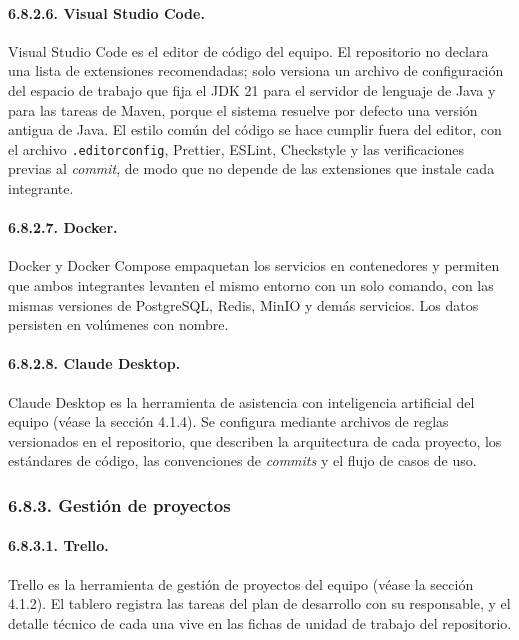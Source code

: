\paragraph{6.8.2.6. Visual Studio Code.}

Visual Studio Code es el editor de código del equipo. El repositorio no declara una lista de extensiones recomendadas; solo versiona un archivo de configuración del espacio de trabajo que fija el JDK 21 para el servidor de lenguaje de Java y para las tareas de Maven, porque el sistema resuelve por defecto una versión antigua de Java. El estilo común del código se hace cumplir fuera del editor, con el archivo \texttt{.editorconfig}, Prettier, ESLint, Checkstyle y las verificaciones previas al \textit{commit}, de modo que no depende de las extensiones que instale cada integrante.

\paragraph{6.8.2.7. Docker.}

Docker y Docker Compose empaquetan los servicios en contenedores y permiten que ambos integrantes levanten el mismo entorno con un solo comando, con las mismas versiones de PostgreSQL, Redis, MinIO y demás servicios. Los datos persisten en volúmenes con nombre.

\paragraph{6.8.2.8. Claude Desktop.}

Claude Desktop es la herramienta de asistencia con inteligencia artificial del equipo (véase la sección 4.1.4). Se configura mediante archivos de reglas versionados en el repositorio, que describen la arquitectura de cada proyecto, los estándares de código, las convenciones de \textit{commits} y el flujo de casos de uso.

\subsubsection{6.8.3. Gestión de proyectos}

\paragraph{6.8.3.1. Trello.}

Trello es la herramienta de gestión de proyectos del equipo (véase la sección 4.1.2). El tablero registra las tareas del plan de desarrollo con su responsable, y el detalle técnico de cada una vive en las fichas de unidad de trabajo del repositorio.

